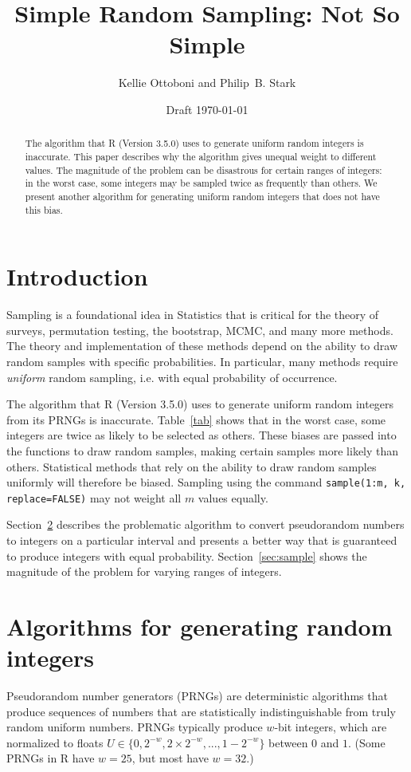 \documentclass[12pt]{article}
\title{Simple Random Sampling: Not So Simple}
\author{Kellie Ottoboni and Philip~B. Stark}
\date{Draft \today}
\begin{document}
\maketitle


\begin{abstract}

The algorithm that R (Version 3.5.0) uses to generate uniform random integers is inaccurate.
This paper describes why the algorithm gives unequal weight to different values.
The magnitude of the problem can be disastrous for certain ranges of integers:
in the worst case, some integers may be sampled twice as frequently than others.
We present another algorithm for generating uniform random integers that does not have this bias.
\end{abstract}



\section{Introduction}

Sampling is a foundational idea in Statistics that is critical for the theory of surveys, permutation testing, the bootstrap, MCMC, and many more methods.
The theory and implementation of these methods depend on the ability to draw random samples with specific probabilities.
In particular, many methods require \textit{uniform} random sampling, i.e. with equal probability of occurrence.

The algorithm that R (Version 3.5.0) \citep{R_2018} uses to generate uniform random integers from its PRNGs is inaccurate.
Table~\ref{tab} shows that in the worst case, some integers are twice as likely to be selected as others.
These biases are passed into the functions to draw random samples, making certain samples more likely than others.
Statistical methods that rely on the ability to draw random samples uniformly will therefore be biased.
Sampling using the command \texttt{sample(1:m, k, replace=FALSE)} may not weight all $m$ values equally.


Section~\ref{sec:algo} describes the problematic algorithm to convert pseudorandom numbers to integers on a particular interval and
presents a better way that is guaranteed to produce integers with equal probability.
Section~\ref{sec:sample} shows the magnitude of the problem for varying ranges of integers.

\section{Algorithms for generating random integers}\label{sec:algo}
Pseudorandom number generators (PRNGs) are deterministic algorithms that produce sequences of numbers that are statistically indistinguishable from truly random uniform numbers.
PRNGs typically produce $w$-bit integers, which are normalized to floats $U\in\{0, 2^{-w}, 2\times 2^{-w}, ..., 1 - 2^{-w}\}$ between $0$ and $1$.
(Some PRNGs in R have $w=25$, but most have $w=32$.)
\end{document}
